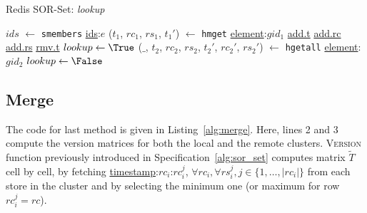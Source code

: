 \begin{algorithm}[t]
\small{
	\caption{Redis SOR-Set: \textit{lookup}}
 	\label{alg:lookup}

 	\begin{algorithmic}[1]
 	    \State $ids$ $\gets$ \texttt{smembers} \underline{ids}:$e$
 	        \State ($t_{1}$, $rc_{1}$, $rs_{1}$, $t_{1}'$) $\gets$ \texttt{hmget} \underline{element}:$gid_{1}$ \underline{add.t} \underline{add.rc} \underline{add.rs} \underline{rmv.t}
 	          \State $lookup \gets \True$
 	              \State ($\_$, $t_{2}$, $rc_{2}$, $rs_{2}$, $t_{2}'$, $rc_{2}'$, $rs_{2}'$) $\gets$ \texttt{hgetall} \underline{element}:$gid_{2}$
 	                \State $lookup \gets \False$
 	                \State \Break
 	              \EndIf
 	            \EndIf
 	          \EndFor
 	            \State \Return \True
 	          \EndIf
 	        \EndIf
 	      \EndIf
 	    \EndFor
 	    \State \Return \False
 	  \EndFunction
	\end{algorithmic}
 }
\end{algorithm}

\subsection{Merge}
\label{sec:ops_merge}

The code for last method is given in Listing~\ref{alg:merge}. Here, lines 2 and
3 compute the version matrices for both the local and the remote clusters.
{\small\textsc{Version}} function previously introduced in
Specification~\ref{alg:sor_set} computes matrix $\tilde{T}$ cell by cell, by
fetching \underline{timestamp}:$rc_{i}$:$rc_{i}^{j}$, $\forall rc_{i}, \forall
rs_{i}^{j}, j \in \{1,\ldots,|rc_{i}|\}$ from each store in the cluster and by
selecting the minimum one (or maximum for row $rc_{i}^{j} = rc$).

